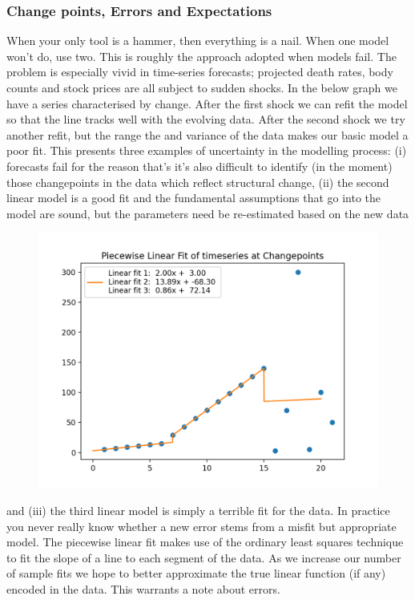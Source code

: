 \documentclass[10pt,a4paper,notitlepage,twocolumn]{article}
\begin{document}
\subsubsection*{Change points, Errors and Expectations}
When your only tool is a hammer, then everything is a nail. When one model won't do, use two. This is roughly the approach adopted when models fail. The problem is especially vivid in time-series forecasts; projected death rates, body counts and stock prices are all subject to sudden shocks. In the below graph we have a series characterised by change. After the first shock we can refit the model so that the line tracks well with the evolving data. After the second shock we try another refit, but the range the and variance of the data makes our basic model a poor fit. This presents three examples of uncertainty in the modelling process: (i) forecasts fail for the reason that's it's also difficult to identify (in the moment) those changepoints in the data which reflect structural change, (ii) the second linear model is a good fit and the fundamental assumptions that go into the model are sound, but the parameters need be re-estimated based on the new data
\begin{figure}[H]
  \includegraphics[width=\linewidth]{./Plots/piecewise_linear_fits.png}
\end{figure}
and (iii) the third linear model is simply a terrible fit for the data. In practice you never really know whether a new error stems from a misfit but appropriate model. The piecewise linear fit makes use of the ordinary least squares technique to fit the slope of a line to each segment of the data. As we increase our number of sample fits we hope to better approximate the true linear function (if any) encoded in the data. This warrants a note about errors.
\end{document}
